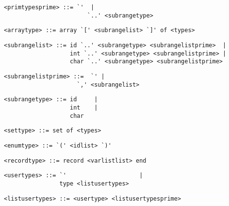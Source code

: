\begin{footnotesize}
\begin{lstlisting}[frame=single, label={primtypesprime}, language=pie]
	<primtypesprime> ::= `'  |
	                    `..' <subrangetype>
\end{lstlisting}
\begin{lstlisting}[frame=single, label={arraytype}, language=pie]
<arraytype> ::= array `[' <subrangelist> `]' of <types>
\end{lstlisting}

\begin{lstlisting}[frame=single, label={subrangelist}, language=pie]
<subrangelist> ::= id `..' <subrangetype> <subrangelistprime>  |
                   int `..' <subrangetype> <subrangelistprime> |
                   char `..' <subrangetype> <subrangelistprime>
\end{lstlisting}

\begin{lstlisting}[frame=single, label={subrangelistprime}, language=pie]
<subrangelistprime> ::=  `' |
	                 `,' <subrangelist>          
\end{lstlisting}
\begin{lstlisting}[frame=single, label={subrangetype}, language=pie]
<subrangetype> ::= id     |
                   int    | 
                   char
\end{lstlisting}

\begin{lstlisting}[frame=single, label={settype}, language=pie]
<settype> ::= set of <types>
\end{lstlisting}

\begin{lstlisting}[frame=single, label={enumtype}, language=pie]
<enumtype> ::= `(' <idlist> `)'
\end{lstlisting}

\begin{lstlisting}[frame=single, label={recordtype}, language=pie]
<recordtype> ::= record <varlistlist> end
\end{lstlisting}

\begin{lstlisting}[frame=single, label={usertypes}]
<usertypes> ::= `'                     |
                type <listusertypes>
\end{lstlisting}

\begin{lstlisting}[frame=single, label={listusertypes}]
<listusertypes> ::= <usertype> <listusertypesprime>
\end{lstlisting}


\end{footnotesize}

